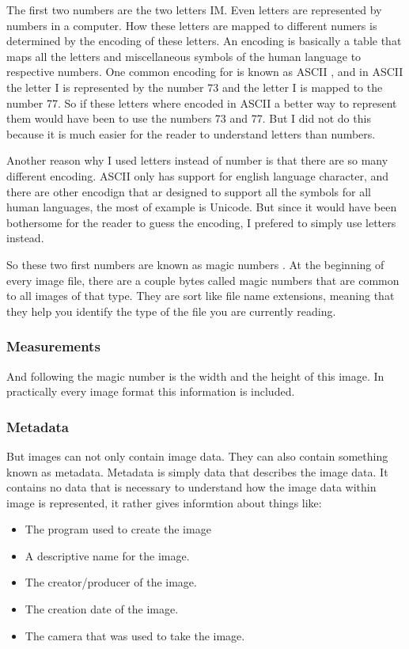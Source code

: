 The first two numbers are the two letters IM. Even letters are
represented by numbers in a computer. How these letters are mapped to
different numers is determined by the encoding of these letters. An
encoding is basically a table that maps all the letters and
miscellaneous symbols of the human language to respective numbers. One
common encoding for is known as ASCII \cite{rfc20}, and in ASCII the
letter I is represented by the number 73 and the letter I is mapped to
the number 77. So if these letters where encoded in ASCII a better way
to represent them would have been to use the numbers 73 and 77. But I
did not do this because it is much easier for the reader to understand
letters than numbers.

Another reason why I used letters instead of number is that there are
so many different encoding. ASCII only has support for english
language character, and there are other encodign that ar designed to
support all the symbols for all human languages, the most of example
is Unicode\cite{allen2007unicode}. But since it would have been
bothersome for the reader to guess the encoding, I prefered to simply
use letters instead.

So these two first numbers are known as magic numbers . At the beginning of every image file, there are a couple
bytes called magic numbers that are common to all images of that
type. They are sort like file name extensions, meaning that they help
you identify the type of the file you are currently reading.

\subsubsection{Measurements}

And following the magic number is the width and the height of this
image. In practically every image format this information is
included.

\subsubsection{Metadata}

But images can not only contain image data. They can also contain
something known as metadata. Metadata is simply data that describes
the image data. It contains no data that is necessary to understand
how the image data within image is represented, it rather gives
informtion about things like:

\begin{itemize}
\item The program used to create the image
\item A descriptive name for the image.
\item The creator/producer of the image.
\item The creation date of the image.
\item The camera that was used to take the image.
\end{itemize}

